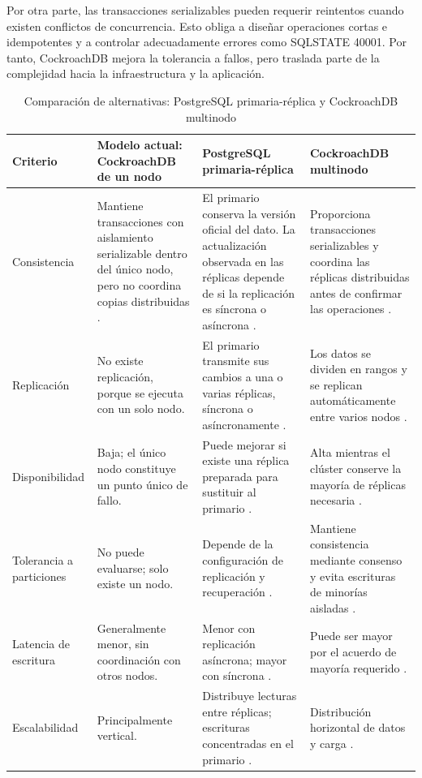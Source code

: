 \documentclass[conference]{IEEEtran}
\begin{document}
Por otra parte, las transacciones serializables pueden requerir reintentos cuando existen conflictos de concurrencia. Esto obliga a diseñar operaciones cortas e idempotentes y a controlar adecuadamente errores como SQLSTATE 40001. Por tanto, CockroachDB mejora la tolerancia a fallos, pero traslada parte de la complejidad hacia la infraestructura y la aplicación.

\begin{table}[htbp]
\caption{Comparación de alternativas: PostgreSQL primaria-réplica y CockroachDB multinodo}
\label{tab:comparativa}
\centering
\footnotesize
\begin{tabular}{p{2.1cm}p{4.2cm}p{4.2cm}p{4.2cm}}
\toprule
\textbf{Criterio} & \textbf{Modelo actual: CockroachDB de un nodo} & \textbf{PostgreSQL primaria-réplica} & \textbf{CockroachDB multinodo} \\
\midrule
Consistencia & Mantiene transacciones con aislamiento serializable dentro del único nodo, pero no coordina copias distribuidas \cite{ref13}. & El primario conserva la versión oficial del dato. La actualización observada en las réplicas depende de si la replicación es síncrona o asíncrona \cite{ref1,ref12}. & Proporciona transacciones serializables y coordina las réplicas distribuidas antes de confirmar las operaciones \cite{ref13}. \\
Replicación & No existe replicación, porque se ejecuta con un solo nodo. & El primario transmite sus cambios a una o varias réplicas, síncrona o asíncronamente \cite{ref1,ref12}. & Los datos se dividen en rangos y se replican automáticamente entre varios nodos \cite{ref13}. \\
Disponibilidad & Baja; el único nodo constituye un punto único de fallo. & Puede mejorar si existe una réplica preparada para sustituir al primario \cite{ref12}. & Alta mientras el clúster conserve la mayoría de réplicas necesaria \cite{ref13}. \\
Tolerancia a particiones & No puede evaluarse; solo existe un nodo. & Depende de la configuración de replicación y recuperación \cite{ref1,ref12}. & Mantiene consistencia mediante consenso y evita escrituras de minorías aisladas \cite{ref13}. \\
Latencia de escritura & Generalmente menor, sin coordinación con otros nodos. & Menor con replicación asíncrona; mayor con síncrona \cite{ref1,ref12}. & Puede ser mayor por el acuerdo de mayoría requerido \cite{ref12,ref13}. \\
Escalabilidad & Principalmente vertical. & Distribuye lecturas entre réplicas; escrituras concentradas en el primario \cite{ref12}. & Distribución horizontal de datos y carga \cite{ref13}. \\

\end{tabular}
\end{table}
\end{document}
